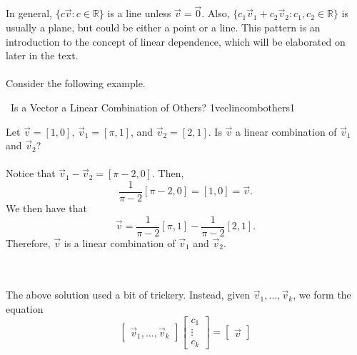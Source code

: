         \vphantom
        \\
        \\
        In general, \(\{c\vec{v}:c\in\mathbb{R}\}\) is a line unless \(\vec{v}=\vec{0}\). Also, \(\{c_1\vec{v}_1+c_2\vec{v}_2:c_1,c_2\in\mathbb{R}\}\) is usually a plane, but could be either a point or a line. This pattern is an introduction to the concept of linear dependence, which will be elaborated on later in the text.
        \pagebreak
        \vphantom
        \\
        \\
        Consider the following example.
        \begin{example}{\Difficulty\,\Difficulty\,\,Is a Vector a Linear Combination of Others? 1}{veclincombothers1}
        
            Let \(\vec{v}=[1,0]\), \(\vec{v}_1=[\pi,1]\), and \(\vec{v}_2=[2,1]\). Is \(\vec{v}\) a linear combination of \(\vec{v}_1\) and \(\vec{v}_2\)?
            \\
            \\
            Notice that \(\vec{v}_1-\vec{v}_2=[\pi-2,0]\). Then,
            \begin{equation*}
                \frac{1}{\pi-2}[\pi-2,0]=[1,0]=\vec{v}.
            \end{equation*}
            We then have that
            \begin{equation*}
                \vec{v}=\frac{1}{\pi-2}[\pi,1]-\frac{1}{\pi-2}[2,1].
            \end{equation*}
            Therefore, \(\vec{v}\) is a linear combination of \(\vec{v}_1\) and \(\vec{v}_2\).
        \end{example}
        \vphantom
        \\
        \\
        The above solution used a bit of trickery. Instead, given \(\vec{v}_1,\ldots,\vec{v}_k\), we form the equation
        \begin{equation*}
            \begin{bmatrix}
                \vec{v}_1,\ldots,\vec{v}_k
            \end{bmatrix}
            \begin{bmatrix}
                c_1 \\ \vdots \\ c_k
            \end{bmatrix}
            =\begin{bmatrix} \vec{v} \end{bmatrix}
        \end{equation*}
